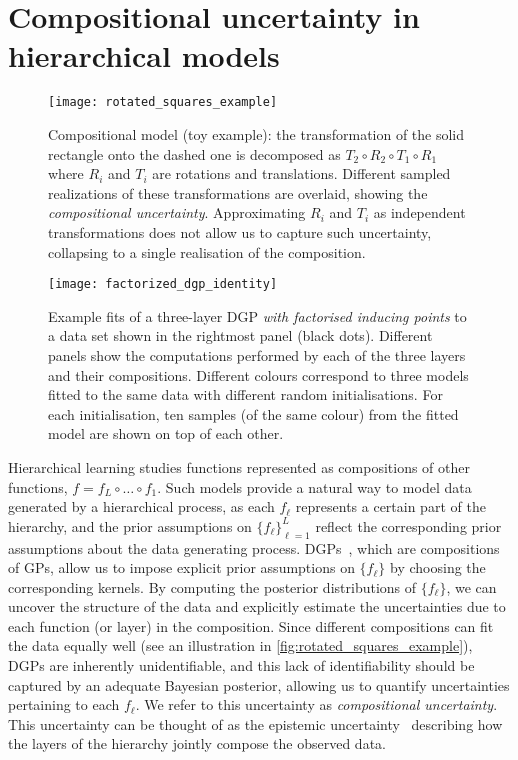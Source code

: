 \section{Compositional uncertainty in hierarchical models}
\label{toc:discussion:composition}
\begin{figure}[t]
    \centering
    \texttt{[image: rotated\_squares\_example]}
    \caption{
        \label{fig:composition:rotated_squares_example}
        Compositional model (toy example): the transformation of the solid rectangle onto the dashed one is decomposed as $T_2 \circ R_2 \circ T_1 \circ R_1$ where $R_i$ and $T_i$ are rotations and translations.
        Different sampled realizations of these transformations are overlaid, showing the \emph{compositional uncertainty}.
        Approximating $R_i$ and $T_i$ as independent transformations does not allow us to capture such uncertainty, collapsing to a single realisation of the composition.
    }
\end{figure}
\begin{figure}[t]
    \centering
    \texttt{[image: factorized\_dgp\_identity]}
    \caption{
        \label{fig:composition:identity_factorised}
        Example fits of a three-layer DGP \emph{with factorised inducing points} to a data set shown in the rightmost panel (black dots).
        Different panels show the computations performed by each of the three layers and their compositions.
        Different colours correspond to three models fitted to the same data with different random initialisations.
        For each initialisation, ten samples (of the same colour) from the fitted model are shown on top of each other.
    }
\end{figure}
Hierarchical learning studies functions represented as compositions of other functions, $f = f_L \circ \ldots \circ f_1$.
Such models provide a natural way to model data generated by a hierarchical process, as each $f_\ell$ represents a certain part of the hierarchy, and the prior assumptions on $\{f_\ell\}_{\ell=1}^{L}$ reflect the corresponding prior assumptions about the data generating process.
DGPs~\parencite{Damianou:2013}, which are compositions of GPs, allow us to impose explicit prior assumptions on $\{f_\ell\}$ by choosing the corresponding kernels.
By computing the posterior distributions of $\{f_\ell\}$, we can uncover the structure of the data and explicitly estimate the uncertainties due to each function (or layer) in the composition.
Since different compositions can fit the data equally well (see an illustration in \cref{fig:rotated_squares_example}), DGPs are inherently unidentifiable, and this lack of identifiability should be captured by an adequate Bayesian posterior, allowing us to quantify uncertainties pertaining to each $f_\ell$.
We refer to this uncertainty as \emph{compositional uncertainty}. This uncertainty can be thought of as the epistemic uncertainty~\parencite{Gal:2016} describing how the layers of the hierarchy jointly compose the observed data.

